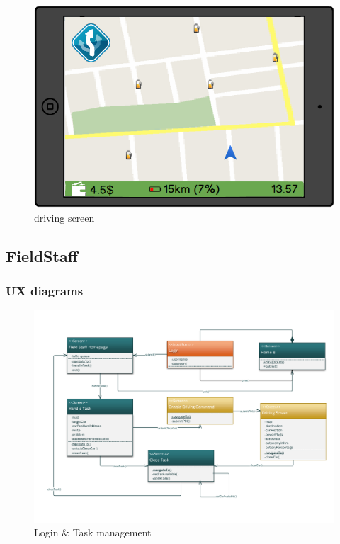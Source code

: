 \documentclass[english]{article}
\begin{document}
\begin{landscape}
\begin{figure}[H]
					\end{figure}
					\begin{figure}[H]
						\centering
						\includegraphics[scale=0.6]{./Mockups/Car/carscreen.png}%
						\caption{driving screen}
					\end{figure}
			\end{landscape}
		\subsection{FieldStaff}
			\subsubsection{UX diagrams}
				\begin{figure}[H]
					\centering
					\includegraphics[scale=0.5]{./UXDiagrams/Fieldstaff/UXDiagramFieldStaffUserAuto.pdf}%
					\caption{Login \& Task management}
				\end{figure}
\end{document}
